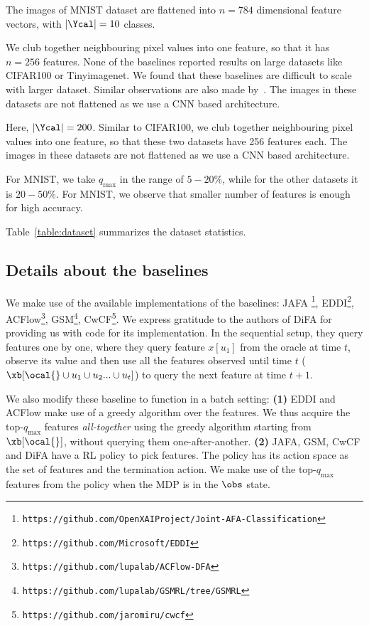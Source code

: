 \documentclass[letterpaper]{article}
\begin{document}
The images of MNIST dataset are flattened into $n=784$ dimensional feature vectors, with $|\Ycal|=10$ classes. 

 We club together neighbouring pixel values into one feature, so that it has $n=256$ features. None of the baselines reported results on large datasets like CIFAR100 or Tinyimagenet. We found that these baselines are difficult to scale with larger dataset. Similar observations are also made by~\citet{gsm}.  The images in these datasets are not flattened as we use a CNN based architecture. 

 Here, $|\Ycal|= 200$. Similar to CIFAR100, we club together neighbouring pixel values into one feature, so that these two datasets have 256 features each. The images in these datasets are not flattened as we use a CNN based architecture. 

For MNIST, we take $q_{\max}$ in the range of $5-20 \%$, while for the other datasets it is $20-50 \%$. For MNIST, we observe that smaller number of features is enough for high accuracy.

Table~\ref{table:dataset} summarizes the dataset statistics.

\subsection{Details about the baselines}
We make use of the available implementations of the baselines: JAFA \footnote{\scriptsize \texttt{https://github.com/OpenXAIProject/Joint-AFA-Classification}}, EDDI\footnote{\scriptsize \texttt{https://github.com/Microsoft/EDDI}}, ACFlow\footnote{\scriptsize \texttt{https://github.com/lupalab/ACFlow-DFA}}, GSM\footnote{\scriptsize \texttt{https://github.com/lupalab/GSMRL/tree/GSMRL}}, CwCF\footnote{\scriptsize \texttt{https://github.com/jaromiru/cwcf}}. We express gratitude to the authors of DiFA for providing us with code for its implementation. In the sequential setup, they query features one by one, where they query feature $x[u_1]$ from the oracle at time $t$, observe its value and then use all the features observed until time $t$ ($\xb[\ocal{} \cup u_1\cup u_2...\cup u_t]$) to query the next feature at time $t+1$.

We also modify these baseline to function in a batch setting: \textbf{(1)} EDDI and ACFlow make use of a greedy algorithm over the features. We thus acquire the top-$q_{\max}$ features \emph{all-together} using the greedy algorithm starting from $\xb[\ocal{}]$, without querying them one-after-another.  \textbf{(2)} JAFA, GSM, CwCF and DiFA have a RL policy to pick features. The policy has its action space as the set of features and the termination action. We make use of the top-$q_{\max}$ features from the policy when the MDP is in the $\obs$ state.
%
\end{document}
